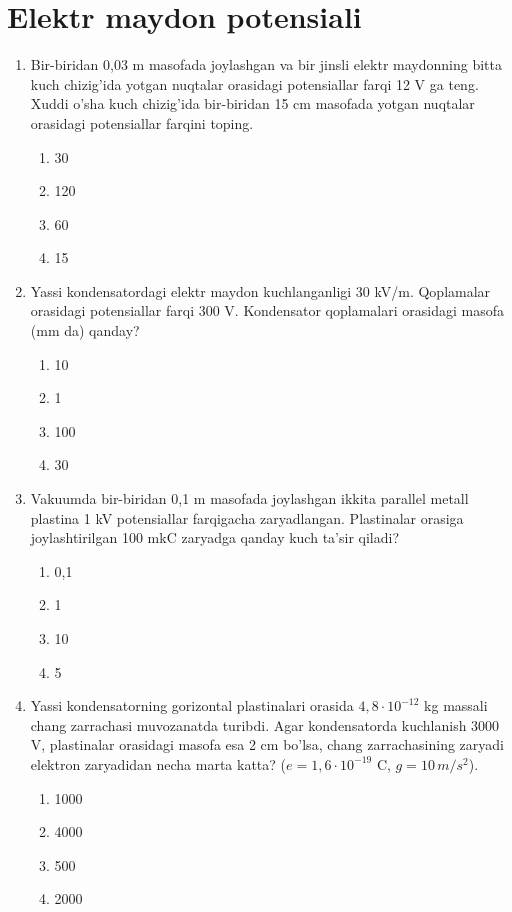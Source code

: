 \section{Elektr maydon potensiali}



\begin{enumerate}

    \item Bir-biridan 0,03 m masofada joylashgan va bir jinsli elektr maydonning bitta kuch chizig’ida yotgan nuqtalar orasidagi potensiallar farqi 12 V ga teng. Xuddi o’sha kuch chizig’ida bir-biridan 15 cm masofada yotgan nuqtalar orasidagi potensiallar farqini toping.
    \begin{enumerate}[label=\Alph*)]
        \item 30
        \item 120
        \item 60 %
        \item 15
    \end{enumerate}

    \item Yassi kondensatordagi elektr maydon kuchlanganligi 30 kV/m. Qoplamalar orasidagi potensiallar farqi 300 V. Kondensator qoplamalari orasidagi masofa (mm da) qanday?
    \begin{enumerate}[label=\Alph*)]
        \item 10 %
        \item 1
        \item 100
        \item 30
    \end{enumerate}

    \item Vakuumda bir-biridan 0,1 m masofada joylashgan ikkita parallel metall plastina 1 kV potensiallar farqigacha zaryadlangan. Plastinalar orasiga joylashtirilgan 100 mkC zaryadga qanday kuch ta’sir qiladi?
    \begin{enumerate}[label=\Alph*)]
        \item 0,1
        \item 1 %
        \item 10
        \item 5
    \end{enumerate}

    \item Yassi kondensatorning gorizontal plastinalari orasida $4,8 \cdot 10^{-12}$ kg massali chang zarrachasi muvozanatda turibdi. Agar kondensatorda kuchlanish 3000 V, plastinalar orasidagi masofa esa 2 cm bo’lsa, chang zarrachasining zaryadi elektron zaryadidan necha marta katta? ($e=1,6 \cdot 10^{-19}$ C, $g=10 \, m/s^2$).
    \begin{enumerate}[label=\Alph*)]
        \item 1000
        \item 4000
        \item 500
        \item 2000 %
    \end{enumerate}


\end{enumerate}
